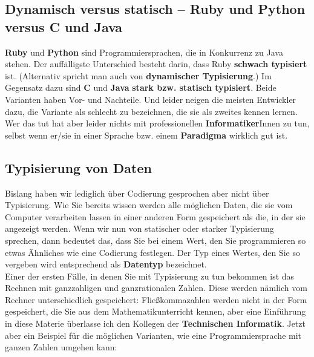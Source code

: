 \subsection{Dynamisch versus statisch – Ruby und Python versus C und Java}
\textbf{Ruby} und \textbf{Python} sind Programmiersprachen, die in Konkurrenz zu Java stehen. Der auffälligste Unterschied besteht darin, dass Ruby \textbf{schwach typisiert} ist. (Alternativ spricht man auch von \textbf{dynamischer Typisierung}.) Im Gegensatz dazu sind \textbf{C} und \textbf{Java} \textbf{stark bzw. statisch typisiert}. Beide Varianten haben Vor- und Nachteile. Und leider neigen die meisten Entwickler dazu, die Variante als schlecht zu bezeichnen, die sie als zweites kennen lernen. Wer das tut hat aber leider nichts mit professionellen \textbf{Informatiker}Innen zu tun, selbst wenn er/sie in einer Sprache bzw. einem \textbf{Paradigma} wirklich gut ist.

\subsection{Typisierung von Daten}
Bislang haben wir lediglich über Codierung gesprochen aber nicht über Typisierung. Wie Sie bereits wissen werden alle möglichen Daten, die sie vom Computer verarbeiten lassen in einer anderen Form gespeichert als die, in der sie angezeigt werden. Wenn wir nun von statischer oder starker Typisierung sprechen, dann bedeutet das, dass Sie bei einem Wert, den Sie programmieren so etwas Ähnliches wie eine Codierung festlegen. Der Typ eines Wertes, den Sie so vergeben wird entsprechend als \textbf{Datentyp} bezeichnet.\\

Einer der ersten Fälle, in denen Sie mit Typisierung zu tun bekommen ist das Rechnen mit ganzzahligen und ganzrationalen Zahlen. Diese werden nämlich vom Rechner unterschiedlich gespeichert: Fließkommazahlen werden nicht in der Form gespeichert, die Sie aus dem Mathematikunterricht kennen, aber eine Einführung in diese Materie überlasse ich den Kollegen der \textbf{Technischen Informatik}. Jetzt aber ein Beispiel für die möglichen Varianten, wie eine Programmiersprache mit ganzen Zahlen umgehen kann:\\

